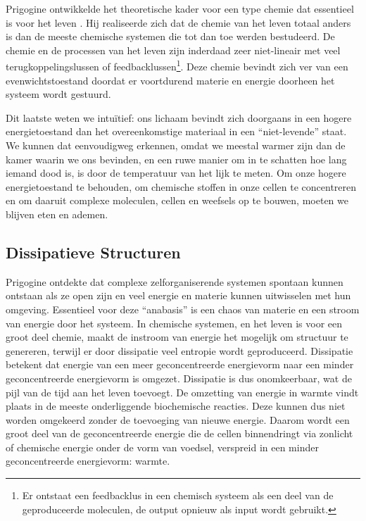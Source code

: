 \documentclass[
  11pt,
]{book}
\begin{document}
Prigogine ontwikkelde het theoretische kader voor een type chemie dat essentieel is voor het leven \citep{prigogineStengers1984}. Hij realiseerde zich dat de chemie van het leven totaal anders is dan de meeste chemische systemen die tot dan toe werden bestudeerd. De chemie en de processen van het leven zijn inderdaad zeer niet-lineair met veel terugkoppelingslussen of feedbacklussen\footnote{Er ontstaat een feedbacklus in een chemisch systeem als een deel van de geproduceerde moleculen, de output opnieuw als input wordt gebruikt.}. Deze chemie bevindt zich ver van een evenwichtstoestand doordat er voortdurend materie en energie doorheen het systeem wordt gestuurd.

Dit laatste weten we intuïtief: ons lichaam bevindt zich doorgaans in een hogere energietoestand dan het overeenkomstige materiaal in een ``niet-levende'' staat. We kunnen dat eenvoudigweg erkennen, omdat we meestal warmer zijn dan de kamer waarin we ons bevinden, en een ruwe manier om in te schatten hoe lang iemand dood is, is door de temperatuur van het lijk te meten. Om onze hogere energietoestand te behouden, om chemische stoffen in onze cellen te concentreren en om daaruit complexe moleculen, cellen en weefsels op te bouwen, moeten we blijven eten en ademen.

\pagebreak

\subsection{Dissipatieve Structuren}\label{dissipatieve-structuren}

Prigogine ontdekte dat complexe zelforganiserende systemen spontaan kunnen ontstaan als ze open zijn en veel energie en materie kunnen uitwisselen met hun omgeving. Essentieel voor deze ``anabasis'' is een chaos van materie en een stroom van energie door het systeem. In chemische systemen, en het leven is voor een groot deel chemie, maakt de instroom van energie het mogelijk om structuur te genereren, terwijl er door dissipatie veel entropie wordt geproduceerd. Dissipatie betekent dat energie van een meer geconcentreerde energievorm naar een minder geconcentreerde energievorm is omgezet. Dissipatie is dus onomkeerbaar, wat de pijl van de tijd aan het leven toevoegt. De omzetting van energie in warmte vindt plaats in de meeste onderliggende biochemische reacties. Deze kunnen dus niet worden omgekeerd zonder de toevoeging van nieuwe energie. Daarom wordt een groot deel van de geconcentreerde energie die de cellen binnendringt via zonlicht of chemische energie onder de vorm van voedsel, verspreid in een minder geconcentreerde energievorm: warmte.
\end{document}
